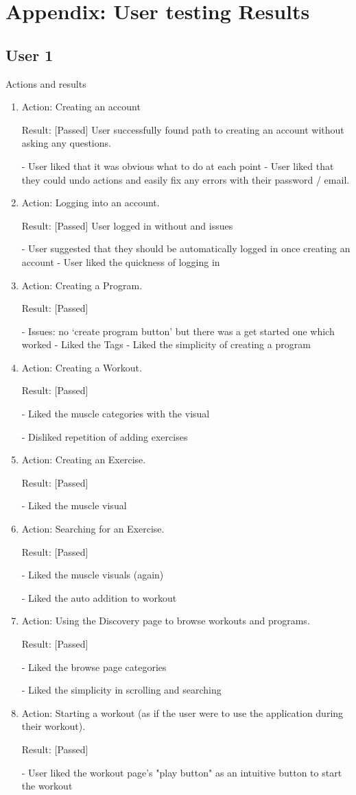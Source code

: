 \documentclass[12pt, titlepage]{article}
\begin{document}
\newpage{}
\section{Appendix: User testing Results}
\subsection{User 1}
Actions and results
\begin{enumerate}
\item Action: Creating an account

Result: [Passed] User successfully found path to creating an account without asking any questions.

-	User liked that it was obvious what to do at each point
-	User liked that they could undo actions and easily fix any errors with their password / email.

\item Action: Logging into an account.

Result: [Passed] User logged in without and issues

-	User suggested that they should be automatically logged in once creating an account
-	User liked the quickness of logging in

\item Action: Creating a Program.

Result: [Passed] 

-	Issues: no ‘create program button’ but there was a get started one which worked
-	Liked the Tags
-	Liked the simplicity of creating a program

\item Action: Creating a Workout.

Result: [Passed]

-	Liked the muscle categories with the visual

-	Disliked repetition of adding exercises

\item Action: Creating an Exercise.

Result: [Passed]

-	Liked the muscle visual

\item Action: Searching for an Exercise.

Result: [Passed]

-	Liked the muscle visuals (again)

-	Liked the auto addition to workout

\item Action: Using the Discovery page to browse workouts and programs.

Result: [Passed]

-	Liked the browse page categories

-	Liked the simplicity in scrolling and searching


\item Action: Starting a workout (as if the user were to use the application during their workout).

Result: [Passed]

-	User liked the workout page's "play button" as an intuitive button to start the workout
\end{enumerate}
\end{document}

